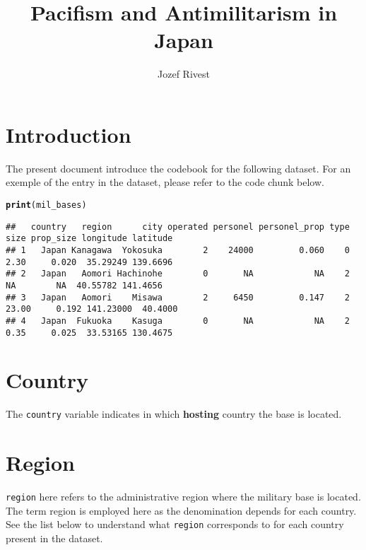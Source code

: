 \documentclass{article}\usepackage[]{graphicx}\usepackage[dvipsnames]{xcolor}
\title{Pacifism and Antimilitarism in Japan}
\author{Jozef Rivest}
\date{ }
\makeatletter
\newcommand{\hldef}[1]{\textcolor[rgb]{0.345,0.345,0.345}{#1}}%
\newcommand{\hlkwd}[1]{\textcolor[rgb]{0.737,0.353,0.396}{\textbf{#1}}}%
\newenvironment{kframe}{%
 \def\at@end@of@kframe{}%
 \ifinner\ifhmode%
  \def\at@end@of@kframe{\end{minipage}}%
  \begin{minipage}{\columnwidth}%
 \fi\fi%
 \def\FrameCommand##1{\hskip\@totalleftmargin \hskip-\fboxsep
 \colorbox{shadecolor}{##1}\hskip-\fboxsep
     \hskip-\linewidth \hskip-\@totalleftmargin \hskip\columnwidth}%
 \MakeFramed {\advance\hsize-\width
   \@totalleftmargin\z@ \linewidth\hsize
   \@setminipage}}%
 {\par\unskip\endMakeFramed%
 \at@end@of@kframe}
\newenvironment{knitrout}{}{} %
\makeatother
\begin{document}
\maketitle
\tableofcontents



\clearpage

\section{Introduction}

The present document introduce the codebook 
for the following dataset. For an exemple of 
the entry in the dataset, please refer to the 
code chunk below. 

\begin{knitrout}\footnotesize
{}\color{fgcolor}\begin{kframe}
\begin{alltt}
\hlkwd{print}\hldef{(mil_bases)}
\end{alltt}
\begin{verbatim}
##   country   region      city operated personel personel_prop type  size prop_size longitude latitude
## 1   Japan Kanagawa  Yokosuka        2    24000         0.060    0  2.30     0.020  35.29249 139.6696
## 2   Japan   Aomori Hachinohe        0       NA            NA    2    NA        NA  40.55782 141.4656
## 3   Japan   Aomori    Misawa        2     6450         0.147    2 23.00     0.192 141.23000  40.4000
## 4   Japan  Fukuoka    Kasuga        0       NA            NA    2  0.35     0.025  33.53165 130.4675
\end{verbatim}
\end{kframe}
\end{knitrout}

\section{Country}

The \verb|country| variable indicates in which \textbf{hosting}
country the base is located.

\section{Region}

\verb|region| here refers to the administrative region 
where the military base is located. The term region 
is employed here as the denomination depends for each 
country. See the list below to understand what \verb|region|
corresponds to for each country present in the dataset. 
\end{document}
